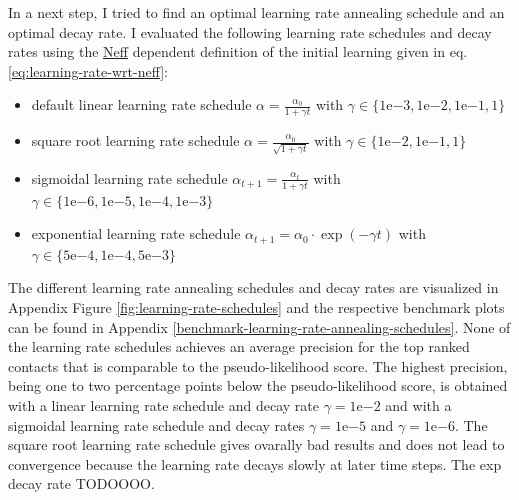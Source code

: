 \documentclass[12pt,a4paper,twoside]{book}
\providecommand{\tightlist}{%
  \setlength{\itemsep}{0pt}\setlength{\parskip}{0pt}}
\newcommand{\eq}{\!=\!}
\theoremstyle{definition}
\theoremstyle{definition}
\theoremstyle{remark}
\begin{document}
In a next step, I tried to find an optimal learning rate annealing
schedule and an optimal decay rate. I evaluated the following learning
rate schedules and decay rates using the
\protect\hyperlink{abbrev}{Neff} dependent definition of the initial
learning given in eq. \eqref{eq:learning-rate-wrt-neff}:

\begin{itemize}
\tightlist
\item
  default linear learning rate schedule
  \(\alpha = \frac{\alpha_0}{1 + \gamma t}\) with
  \(\gamma \in \{1\mathrm{e}{-3}, 1\mathrm{e}{-2}, 1\mathrm{e}{-1}, 1 \}\)
\item
  square root learning rate schedule
  \(\alpha = \frac{\alpha_0}{\sqrt{1 + \gamma t}}\) with
  \(\gamma \in \{1\mathrm{e}{-2}, 1\mathrm{e}{-1}, 1 \}\)
\item
  sigmoidal learning rate schedule
  \(\alpha_{t+1} = \frac{\alpha_{t}}{1 + \gamma t}\) with
  \(\gamma \in \{1\mathrm{e}{-6}, 1\mathrm{e}{-5}, 1\mathrm{e}{-4}, 1\mathrm{e}{-3}\}\)
\item
  exponential learning rate schedule
  \(\alpha_{t+1} = \alpha_0 \cdot\exp(- \gamma t)\) with
  \(\gamma \in \{5\mathrm{e}{-4}, 1\mathrm{e}{-4}, 5\mathrm{e}{-3}\}\)
\end{itemize}

The different learning rate annealing schedules and decay rates are
visualized in Appendix Figure \ref{fig:learning-rate-schedules} and the
respective benchmark plots can be found in Appendix
\ref{benchmark-learning-rate-annealing-schedules}. None of the learning
rate schedules achieves an average precision for the top ranked contacts
that is comparable to the pseudo-likelihood score. The highest
precision, being one to two percentage points below the
pseudo-likelihood score, is obtained with a linear learning rate
schedule and decay rate \(\gamma \eq 1\mathrm{e}{-2}\) and with a
sigmoidal learning rate schedule and decay rates
\(\gamma \eq 1\mathrm{e}{-5}\) and \(\gamma \eq 1\mathrm{e}{-6}\). The
square root learning rate schedule gives ovarally bad results and does
not lead to convergence because the learning rate decays slowly at later
time steps. The exp decay rate TODOOOO.
\end{document}
